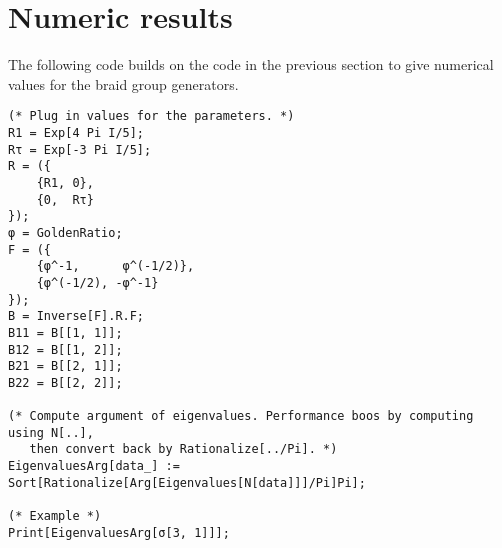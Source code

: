 \section{Numeric results}

The following code builds on the code in the previous section to give numerical values for the braid group generators.

\begin{verbatim}
(* Plug in values for the parameters. *)
R1 = Exp[4 Pi I/5];
Rτ = Exp[-3 Pi I/5];
R = ({
    {R1, 0},
    {0,  Rτ}
});
φ = GoldenRatio;
F = ({
    {φ^-1,      φ^(-1/2)},
    {φ^(-1/2), -φ^-1}
});
B = Inverse[F].R.F;
B11 = B[[1, 1]];
B12 = B[[1, 2]];
B21 = B[[2, 1]];
B22 = B[[2, 2]];

(* Compute argument of eigenvalues. Performance boos by computing using N[..],
   then convert back by Rationalize[../Pi]. *)
EigenvaluesArg[data_] := Sort[Rationalize[Arg[Eigenvalues[N[data]]]/Pi]Pi];

(* Example *)
Print[EigenvaluesArg[σ[3, 1]]];
\end{verbatim}
